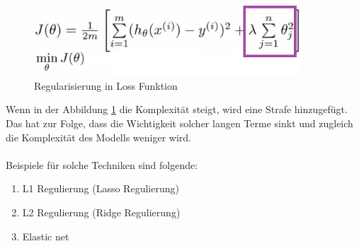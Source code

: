 \documentclass[12pt,oneside,a4paper,parskip]{scrbook}
\begin{document}
\begin{figure}[h]
	\begin{center}
		\includegraphics[width=10cm]{Bilder/regFunc.png}
		\caption{Regularisierung in Loss Funktion\cite{towardDataReg}}
		\label{fig:regFunc}
	\end{center}
\end{figure}
Wenn in der Abbildung \ref{fig:regFunc} die Komplexität steigt, wird eine Strafe hinzugefügt. Das hat zur Folge, dass die Wichtigkeit solcher langen Terme sinkt und zugleich die Komplexität des Modells weniger wird.
\\\\
Beispiele für solche Techniken sind folgende:
\begin{enumerate}
	\item L1 Regulierung (Lasso Regulierung)
	\item L2 Regulierung (Ridge Regulierung)
	\item Elastic net
\end{enumerate}
\end{document}
